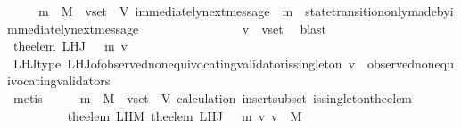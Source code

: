 \begin{isabellebody}
\ {\isacartoucheopen}{\isasymsigma}\ {\isasymin}\ {\isasymSigma}\ {\isasymand}\ m\ {\isasymin}\ M\ {\isasymand}\ v{\isacharunderscore}set\ {\isasymsubseteq}\ V{\isacartoucheclose}\ {\isacartoucheopen}immediately{\isacharunderscore}next{\isacharunderscore}message\ {\isacharparenleft}{\isasymsigma}{\isacharcomma}\ m{\isacharparenright}{\isacartoucheclose}\ \ state{\isacharunderscore}transition{\isacharunderscore}only{\isacharunderscore}made{\isacharunderscore}by{\isacharunderscore}immediately{\isacharunderscore}next{\isacharunderscore}message\isanewline
\ \ \ \ \ \ \ \ \ \ \ \ \ \ \ \ {\isacartoucheopen}v\ {\isasymin}\ v{\isacharunderscore}set{\isacartoucheclose}\ \isamarkupfalse%
\ blast\isanewline
\ \ \ \ \ \ \ \ \isamarkupfalse%
\ {\isachardoublequoteopen}the{\isacharunderscore}elem\ {\isacharparenleft}L{\isacharunderscore}H{\isacharunderscore}J\ {\isacharparenleft}{\isasymsigma}\ {\isasymunion}\ {\isacharbraceleft}m{\isacharbraceright}{\isacharparenright}\ v{\isacharparenright}\ {\isasymin}\ {\isasymSigma}{\isachardoublequoteclose}\isanewline
\ \ \ \ \ \ \ \ \ \ \isamarkupfalse%
\ L{\isacharunderscore}H{\isacharunderscore}J{\isacharunderscore}type\ L{\isacharunderscore}H{\isacharunderscore}J{\isacharunderscore}of{\isacharunderscore}observed{\isacharunderscore}non{\isacharunderscore}equivocating{\isacharunderscore}validator{\isacharunderscore}is{\isacharunderscore}singleton\ {\isacartoucheopen}v\ {\isasymin}\ observed{\isacharunderscore}non{\isacharunderscore}equivocating{\isacharunderscore}validators\ {\isasymsigma}{\isacartoucheclose}\isanewline
\ \ \ \ \ \ \ \ \ \ \isamarkupfalse%
\ {\isacharparenleft}metis\ \ {\isacartoucheopen}{\isasymsigma}\ {\isasymin}\ {\isasymSigma}\ {\isasymand}\ m\ {\isasymin}\ M\ {\isasymand}\ v{\isacharunderscore}set\ {\isasymsubseteq}\ V{\isacartoucheclose}\ calculation{\isacharparenleft}{}{\isacharparenright}\ insert{\isacharunderscore}subset\ is{\isacharunderscore}singleton{\isacharunderscore}the{\isacharunderscore}elem{\isacharparenright}\ \isanewline
\ \ \ \ \ \ \ \ \isamarkupfalse%
\ {\isachardoublequoteopen}the{\isacharunderscore}elem\ {\isacharparenleft}L{\isacharunderscore}H{\isacharunderscore}M\ {\isacharparenleft}the{\isacharunderscore}elem\ {\isacharparenleft}L{\isacharunderscore}H{\isacharunderscore}J\ {\isacharparenleft}{\isasymsigma}\ {\isasymunion}\ {\isacharbraceleft}m{\isacharbraceright}{\isacharparenright}\ v{\isacharparenright}{\isacharparenright}\ v{\isacharprime}{\isacharparenright}\ {\isasymin}\ M{\isachardoublequoteclose}\isanewline

\end{isabellebody}
